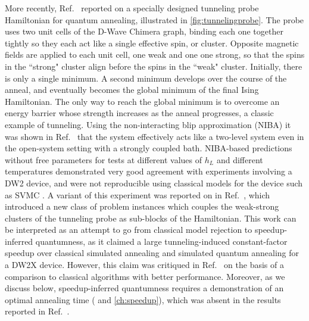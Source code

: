 More recently, Ref.~\cite{Boixo:2014yu} reported on a specially designed tunneling probe Hamiltonian for quantum annealing, illustrated in \ref{fig:tunnelingprobe}. The probe uses two unit cells of the D-Wave Chimera graph, binding each one together tightly so they each act like a single effective spin, or cluster. Opposite magnetic fields are applied to each unit cell, one weak and one one strong, so that the spins in the ``strong" cluster align before the spins in the ``weak" cluster.
Initially, there is only a single minimum. A second minimum develops over the course of the anneal, and eventually becomes the global minimum of the final Ising Hamiltonian.
The only way to reach the global minimum is to overcome an energy barrier whose strength increases as the anneal progresses, a classic example of tunneling. Using the non-interacting blip approximation (NIBA) it was shown in Ref.~\cite{Boixo:2014yu} that the system effectively acts like a two-level system even in the open-system setting with a strongly coupled bath. NIBA-based predictions without free parameters
for tests at different values of $h_L$ and different temperatures demonstrated very good agreement with experiments involving a DW2 device, and were not reproducible using classical models for the device such as SVMC \cite{SSSV}. A variant of this experiment was reported on in Ref.~\cite{PhysRevX.6.031015}, which introduced a new class of problem instances which couples the weak-strong clusters of the tunneling probe as sub-blocks of the Hamiltonian. This work can be interpreted as an attempt to go from classical model rejection to speedup-inferred quantumness, as it claimed a large tunneling-induced constant-factor speedup over classical simulated annealing and simulated quantum annealing for a DW2X device. However, this claim was critiqued in Ref.~\cite{2016arXiv160401746M} on the basis of a comparison to classical algorithms with better performance. Moreover, as we discuss below, speedup-inferred quantumness requires a demonstration of an optimal annealing time (\cite{speedup} and \ref{ch:speedup}), which was absent in the results reported in Ref.~\cite{PhysRevX.6.031015}.


